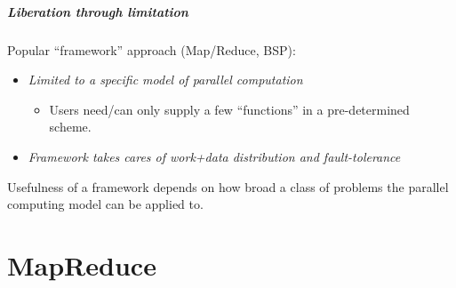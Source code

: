 \documentclass[english,serif,mathserif]{beamer}
\begin{document}



\begin{frame}
  \frametitle{Liberation through limitation}

  Popular ``framework'' approach (Map/Reduce, BSP):
  \begin{itemize}
  \item \emph{Limited to a specific model of parallel computation}
    \begin{itemize}
    \item Users need/can only supply a few ``functions'' in a pre-determined scheme.
    \end{itemize}

  \item \emph{Framework takes cares of work+data distribution and fault-tolerance}
  \end{itemize}

  \+
  Usefulness of a framework depends on how broad a class of problems
  the parallel computing model can be applied to.
\end{frame}


\part{MapReduce}
\end{document}
